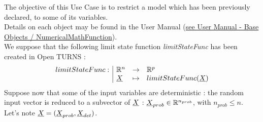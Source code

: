 \renewcommand{\filename}{docUC_LSF_DeterministicVar1.tex}
\renewcommand{\filetitle}{UC : Introducing some deterministic variables, using a LinearNumericalMathFunction}

\HeaderIIILevel


\label{linearNumericalMathFunction}



The objective of this Use Case is to restrict a model which has been previously declared, to some of its variables.\\

Details on each object may be found in the User Manual  (\href{OpenTURNS_UserManual_TUI.pdf}{see User Manual - Base Objects / NumericalMathFunction}).\\



We suppose that the following limit state function {\itshape limitStateFunc} has been created in Open TURNS :
$$
\begin{array}{l|lcl}
  limitStateFunc : & \mathbb{R}^n  & \rightarrow & \mathbb{R}^p \\
  & {\underline{X}}      & \mapsto     & limitStateFunc({\underline{X}})
\end{array}
$$
Suppose now that some of the input variables are deterministic : the random input vector is reduced to a subvector of ${\underline{X}}$ : ${\underline{X}}_{prob} \in \mathbb{R}^{n_{prob}}$, with $n_{prob} \leq n$.\\
Let's note ${\underline{X}} = ({\underline{X}}_{prob}, {\underline{X}}_{det})$.\\


